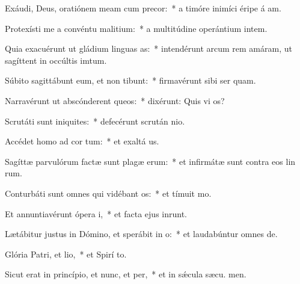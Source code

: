 \item Exáudi, Deus, oratiónem meam cum precor:~* a timóre inimíci éripe á am.
\item Protexísti me a convéntu malitium:~* a multitúdine operántium intem.
\item Quia exacuérunt ut gládium linguas as:~* intendérunt arcum rem amáram, ut sagíttent in occúltis imtum.
\item Súbito sagittábunt eum, et non tibunt:~* firmavérunt sibi ser quam.
\item Narravérunt ut abscónderent queos:~* dixérunt: Quis vi os?
\item Scrutáti sunt iniquites:~* defecérunt scrután nio.
\item Accédet homo ad cor tum:~* et exaltá us.
\item Sagíttæ parvulórum factæ sunt plagæ erum:~* et infirmátæ sunt contra eos lin rum.
\item Conturbáti sunt omnes qui vidébant os:~* et tímuit  mo.
\item Et annuntiavérunt ópera i,~* et facta ejus inrunt.
\item Lætábitur justus in Dómino, et sperábit in o:~* et laudabúntur omnes  de.
\item Glória Patri, et lio,~* et Spirí to.
\item Sicut erat in princípio, et nunc, et per,~* et in sǽcula sæcu. men.
